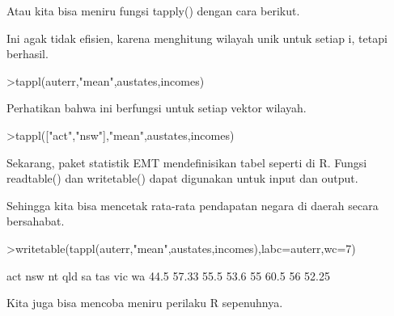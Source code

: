 \documentclass[a4paper,10pt]{article}
\begin{document}
\begin{eulernotebook}
\begin{eulercomment}
\begin{eulercomment}
\begin{eulercomment}
\begin{eulercomment}
\begin{eulercomment}
\begin{eulercomment}
\begin{eulercomment}
Atau kita bisa meniru fungsi tapply() dengan cara berikut.
\end{eulercomment}
\begin{eulercomment}
Ini agak tidak efisien, karena menghitung wilayah unik untuk setiap i,
tetapi berhasil.
\end{eulercomment}
\begin{eulerprompt}
>tappl(auterr,"mean",austates,incomes)
\end{eulerprompt}
\begin{euleroutput}
  [44.5,  57.3333333333,  55.5,  53.6,  55,  60.5,  56,  52.25]
\end{euleroutput}
\begin{eulercomment}
Perhatikan bahwa ini berfungsi untuk setiap vektor wilayah.
\end{eulercomment}
\begin{eulerprompt}
>tappl(["act","nsw"],"mean",austates,incomes)
\end{eulerprompt}
\begin{euleroutput}
  [44.5,  57.3333333333]
\end{euleroutput}
\begin{eulercomment}
Sekarang, paket statistik EMT mendefinisikan tabel seperti di R.
Fungsi readtable() dan writetable() dapat digunakan untuk input dan
output.

Sehingga kita bisa mencetak rata-rata pendapatan negara di daerah
secara bersahabat.
\end{eulercomment}
\begin{eulerprompt}
>writetable(tappl(auterr,"mean",austates,incomes),labc=auterr,wc=7)
\end{eulerprompt}
\begin{euleroutput}
      act    nsw     nt    qld     sa    tas    vic     wa
     44.5  57.33   55.5   53.6     55   60.5     56  52.25
\end{euleroutput}
\begin{eulercomment}
Kita juga bisa mencoba meniru perilaku R sepenuhnya.


\end{eulercomment}
\end{eulercomment}
\end{eulercomment}
\end{eulercomment}
\end{eulercomment}
\end{eulercomment}
\end{eulercomment}
\end{eulernotebook}
\end{document}
